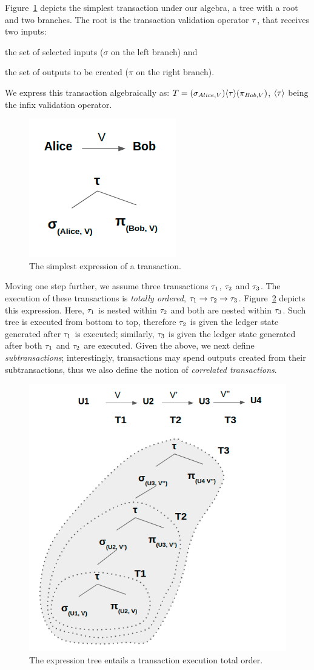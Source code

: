 Figure~\ref{fig:simplest_tx} depicts the simplest transaction under our
algebra, \ie a tree with a root and two branches. The root is the transaction
validation operator $\tau$, that receives two inputs:
\begin{inparaenum}[a)]
    \item the set of selected inputs ($\sigma$ on the left branch) and
    \item the set of outputs to be created ($\pi$ on the right branch).
\end{inparaenum}
We express this transaction algebraically as: $T = (\sigma_{Alice, V}) \langle \tau \rangle
(\pi_{Bob,V})$, $\langle \tau \rangle$ being the infix validation operator.

\begin{figure}[h!]
    \centering
    \includegraphics[width=0.3\columnwidth,keepaspectratio]{figures/utxo_growth/simplest_tx.png}
    \caption{The simplest expression of a transaction.}
    \label{fig:simplest_tx}
\end{figure}

Moving one step further, we assume three transactions $\tau_1$, $\tau_2$ and
$\tau_3$. The execution of these transactions is \emph{totally ordered}, \ie
$\tau_1 \rightarrow \tau_2 \rightarrow \tau_3$. Figure~\ref{fig:tx_order} depicts
this expression. Here, $\tau_1$ is nested within $\tau_2$ and both are nested
within $\tau_3$. Such tree is executed from bottom to top, therefore $\tau_2$ is
given the ledger state generated after $\tau_1$ is executed; similarly, $\tau_3$
is given the ledger state generated after both $\tau_1$ and $\tau_2$ are
executed. Given the above, we next define \emph{subtransactions};
interestingly, transactions may spend outputs created from their
subtransactions, thus we also define the notion of \emph{correlated
transactions}.

\begin{figure}[h!]
    \centering
    \includegraphics[width=0.5\columnwidth,keepaspectratio]{figures/utxo_growth/tx_order.png}
    \caption{The expression tree entails a transaction execution total
            order.}
    \label{fig:tx_order}
\end{figure}

